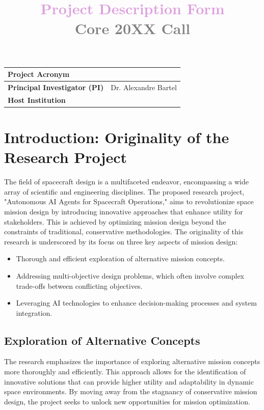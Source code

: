 \documentclass[a4paper, 11pt]{article}
\title{\bf \textcolor{Plum}{Project Description Form} \\ \textcolor{Gray}{Core 20XX Call}}
\author{\vspace{-5ex}}
\date{\vspace{-5ex}}
\begin{document}
\vspace{10cm}
\maketitle

\begin{center}
\begin{tabular}{|p{4.5cm}|p{}|}
\hline
\bf Project Acronym  &  \\ \hline
\bf Principal Investigator (PI)  &  Dr. Alexandre Bartel \\ \hline
\bf Host Institution  & \\ \hline
\end{tabular}
\end{center}

\newpage
\section{Introduction: Originality of the Research Project}

The field of spacecraft design is a multifaceted endeavor, encompassing a wide array of scientific and engineering disciplines. The proposed research project, "Autonomous AI Agents for Spacecraft Operations," aims to revolutionize space mission design by introducing innovative approaches that enhance utility for stakeholders. This is achieved by optimizing mission design beyond the constraints of traditional, conservative methodologies. The originality of this research is underscored by its focus on three key aspects of mission design:

\begin{itemize}
    \item Thorough and efficient exploration of alternative mission concepts.
    \item Addressing multi-objective design problems, which often involve complex trade-offs between conflicting objectives.
    \item Leveraging AI technologies to enhance decision-making processes and system integration.
\end{itemize}

\subsection{Exploration of Alternative Concepts}

The research emphasizes the importance of exploring alternative mission concepts more thoroughly and efficiently. This approach allows for the identification of innovative solutions that can provide higher utility and adaptability in dynamic space environments. By moving away from the stagnancy of conservative mission design, the project seeks to unlock new opportunities for mission optimization.
\end{document}
